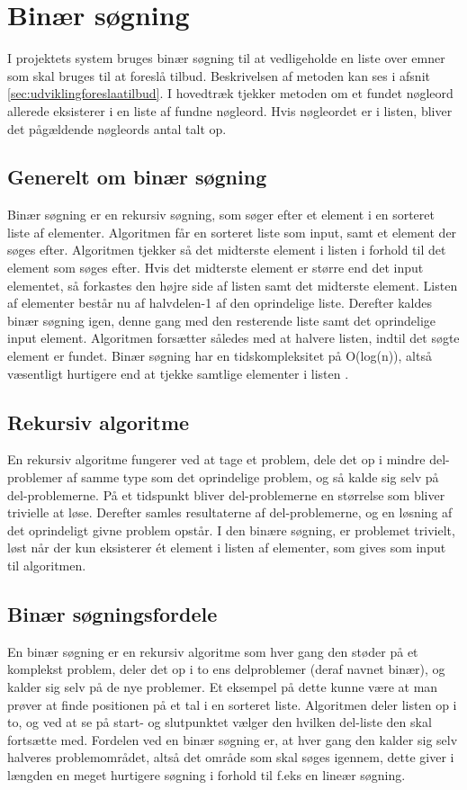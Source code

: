 \chapter{Binær søgning}
I projektets system bruges binær søgning til at vedligeholde en liste over emner som skal bruges til at foreslå tilbud. Beskrivelsen af metoden  kan ses i afsnit \ref{sec:udviklingforeslaatilbud}. I hovedtræk tjekker metoden om et fundet nøgleord allerede eksisterer i en liste af fundne nøgleord. Hvis nøgleordet er i listen, bliver det pågældende nøgleords antal talt op. 

\section{Generelt om binær søgning}
Binær søgning er en rekursiv søgning, som søger efter et element i en sorteret liste af elementer. Algoritmen får en sorteret liste som input, samt et element der søges efter. Algoritmen tjekker så det midterste element i listen i forhold til det element som søges efter. Hvis det midterste element er større end det input elementet, så forkastes den højre side af listen samt det midterste element. Listen af elementer består nu af halvdelen-1 af den oprindelige liste. Derefter kaldes binær søgning igen, denne gang med den resterende liste samt det oprindelige input element. Algoritmen forsætter således med at halvere listen, indtil det søgte element er fundet. Binær søgning har en tidskompleksitet på O(log(n)), altså væsentligt hurtigere end at tjekke samtlige elementer i listen \citep{IntroAlgo}.

\section{Rekursiv algoritme}
En rekursiv algoritme fungerer ved at tage et problem, dele det op i mindre del-problemer af samme type som det oprindelige problem, og så kalde sig selv på del-problemerne. På et tidspunkt bliver del-problemerne en størrelse som bliver trivielle at løse. Derefter samles resultaterne af del-problemerne, og en løsning af det oprindeligt givne problem opstår. I den binære søgning, er problemet trivielt, løst når der kun eksisterer ét element i listen af elementer, som gives som input til algoritmen.

\section{Binær søgningsfordele}
En binær søgning er en rekursiv algoritme som hver gang den støder på et komplekst problem, deler det op i to ens delproblemer (deraf navnet binær), og kalder sig selv på de nye problemer. Et eksempel på dette kunne være at man prøver at finde positionen på et tal i en sorteret liste. Algoritmen deler listen op i to, og ved at se på start- og slutpunktet vælger den hvilken del-liste den skal fortsætte med. Fordelen ved en binær søgning er, at hver gang den kalder sig selv halveres problemområdet, altså det område som skal søges igennem, dette giver i længden en meget hurtigere søgning i forhold til f.eks en lineær søgning.

